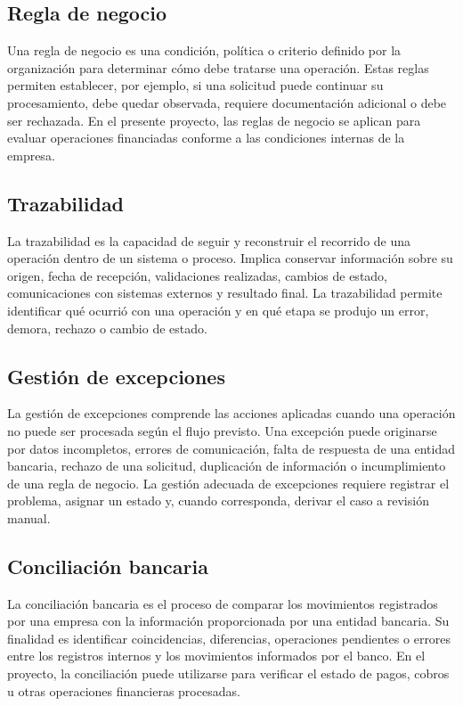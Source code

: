 \subsection{Regla de negocio}

Una regla de negocio es una condición, política o criterio definido por la organización para determinar cómo debe tratarse una operación. Estas reglas permiten establecer, por ejemplo, si una solicitud puede continuar su procesamiento, debe quedar observada, requiere documentación adicional o debe ser rechazada. En el presente proyecto, las reglas de negocio se aplican para evaluar operaciones financiadas conforme a las condiciones internas de la empresa.

\subsection{Trazabilidad}

La trazabilidad es la capacidad de seguir y reconstruir el recorrido de una operación dentro de un sistema o proceso. Implica conservar información sobre su origen, fecha de recepción, validaciones realizadas, cambios de estado, comunicaciones con sistemas externos y resultado final. La trazabilidad permite identificar qué ocurrió con una operación y en qué etapa se produjo un error, demora, rechazo o cambio de estado.

\subsection{Gestión de excepciones}

La gestión de excepciones comprende las acciones aplicadas cuando una operación no puede ser procesada según el flujo previsto. Una excepción puede originarse por datos incompletos, errores de comunicación, falta de respuesta de una entidad bancaria, rechazo de una solicitud, duplicación de información o incumplimiento de una regla de negocio. La gestión adecuada de excepciones requiere registrar el problema, asignar un estado y, cuando corresponda, derivar el caso a revisión manual.

\subsection{Conciliación bancaria}

La conciliación bancaria es el proceso de comparar los movimientos registrados por una empresa con la información proporcionada por una entidad bancaria. Su finalidad es identificar coincidencias, diferencias, operaciones pendientes o errores entre los registros internos y los movimientos informados por el banco. En el proyecto, la conciliación puede utilizarse para verificar el estado de pagos, cobros u otras operaciones financieras procesadas.


